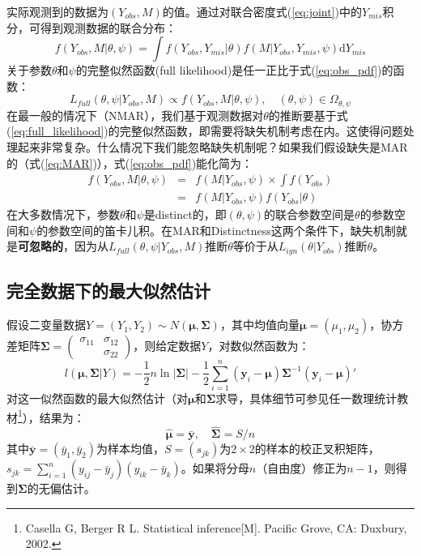 \documentclass[aps,pre,12pt,preprint,onecolumn,showpacs,showkeys,AutoFakeBold]{revtex4-1}
\def \d {\mathrm d}
\begin{document}
    实际观测到的数据为$(Y_{obs},M)$的值。通过对联合密度式(\ref{eq:joint})中的$Y_{mis}$积分，可得到观测数据的联合分布：
    \begin{equation}\label{eq:obs_pdf}
        f(Y_{obs},M\vert \theta,\psi)=\int f(Y_{obs},Y_{mis}\vert \theta) f(M \vert Y_{obs}, Y_{mis}, \psi)\d Y_{mis}
    \end{equation}
    关于参数$\theta$和$\psi$的完整似然函数(full likelihood)是任一正比于式(\ref{eq:obs_pdf})的函数：
    \begin{equation}\label{eq:full_likelihood}
        L_{full}(\theta, \psi\vert Y_{obs}, M)\propto f(Y_{obs},M\vert \theta ,\psi),\quad (\theta, \psi)\in \Omega _{\theta, \psi}
    \end{equation}
    在最一般的情况下（NMAR），我们基于观测数据对$\theta$的推断要基于式(\ref{eq:full_likelihood})的完整似然函数，即需要将缺失机制考虑在内。这使得问题处理起来非常复杂。什么情况下我们能忽略缺失机制呢？如果我们假设缺失是MAR的（式(\ref{eq:MAR})），式(\ref{eq:obs_pdf})能化简为：
    \begin{eqnarray}
        f(Y_{obs},M\vert \theta, \psi)&=&f(M\vert Y_{obs},\psi)\times \int f(Y_{obs})\nonumber \\
        &=&f(M\vert Y_{obs},\psi)f(Y_{obs}\vert \theta)
    \end{eqnarray}
    在大多数情况下，参数$\theta$和$\psi$是distinct的，即$(\theta, \psi)$的联合参数空间是$\theta$的参数空间和$\psi$的参数空间的笛卡儿积。在MAR和Distinctness这两个条件下，缺失机制就是\textbf{可忽略的}，因为从$L_{full}(\theta,\psi\vert Y_{obs},M)$推断$\theta$等价于从$L_{ign}(\theta\vert Y_{obs})$推断$\theta$。
    
    \subsection{完全数据下的最大似然估计}\label{sec:complete_cases_likelihood}
    假设二变量数据$Y=(Y_1,Y_2)\sim  N(\bm{\mu}, \bm\Sigma)$，其中均值向量$\bm \mu =(\mu_1, \mu_2)$，协方差矩阵$\bm \Sigma=\left(\begin{array}{cc} \sigma _{11}&\sigma _{12}\\&\sigma _{22}
    \end{array}\right)$，则给定数据$Y$，对数似然函数为：
    \begin{equation}\label{eq:complete_cases_likelihood}
        l(\bm \mu, \bm \Sigma \vert Y)=-\frac{1}{2}n\ln \vert \bm \Sigma \vert -\frac{1}{2}\sum _{i=1}^n(\bm y_i-\bm \mu)\bm \Sigma ^{-1}(\bm y_i -\bm \mu)'
    \end{equation}
    对这一似然函数的最大似然估计（对$\bm \mu$和$\bm \Sigma$求导，具体细节可参见任一数理统计教材\footnote{Casella G, Berger R L. Statistical inference[M]. Pacific Grove, CA: Duxbury, 2002.}），结果为：
    \begin{equation}
        \hat{\bm \mu} =\bar{\bm y},\quad \hat{\bm \Sigma}=S/n
    \end{equation}
    其中$\bar{\bm y}=(\bar y_1, \bar y_2)$为样本均值，$S=(s_{jk})$为$2\times 2$的样本的校正叉积矩阵，$s_{jk}=\sum _{i=1}^n (y_{ij}-\bar y_j)(y_{ik}-\bar y_k)$。如果将分母$n$（自由度）修正为$n-1$，则得到$\bm \Sigma$的无偏估计。
        
\end{document}
